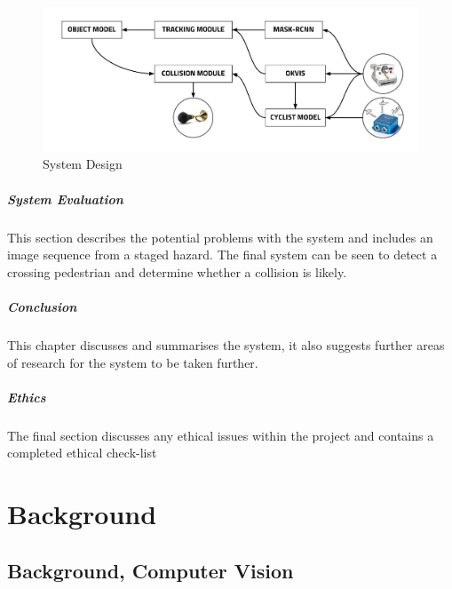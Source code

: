\documentclass[11pt,twoside]{report}
\begin{document}
\noindent \begin{figure}[h!]
	\includegraphics[width = 1.0\hsize]{figures/software_architecture.png}
	\caption{System Design}
	\label{software_soln1}
\end{figure}


\paragraph{System Evaluation}
This section describes the potential problems with the system and includes an image sequence from a staged hazard. The final system can be seen to detect a crossing pedestrian and determine whether a collision is likely.

\paragraph{Conclusion}
This chapter discusses and summarises the system, it also suggests further areas of research for the system to be taken further.

\paragraph{Ethics}
The final section discusses any ethical issues within the project and contains a completed ethical check-list


\newpage



\chapter{Background}
\section{Background, Computer Vision}\label{comp_vis_back}
\end{document}
